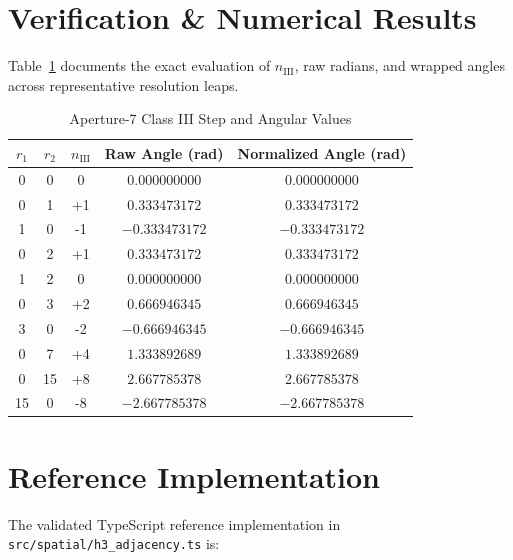 \documentclass[10pt,journal,compsoc]{IEEEtran}
\begin{document}
\section{Verification \& Numerical Results}

Table~\ref{tab:verification} documents the exact evaluation of $n_{\text{III}}$, raw radians, and wrapped angles across representative resolution leaps.

\begin{table}[htbp]
\caption{Aperture-7 Class III Step and Angular Values}
\label{tab:verification}
\centering
\begin{tabular}{ccccc}
\toprule
$r_1$ & $r_2$ & $n_{\text{III}}$ & Raw Angle (rad) & Normalized Angle (rad) \\
\midrule
0 & 0  &  0 & $0.000000000$ & $0.000000000$ \\
0 & 1  & +1 & $0.333473172$ & $0.333473172$ \\
1 & 0  & -1 & $-0.333473172$ & $-0.333473172$ \\
0 & 2  & +1 & $0.333473172$ & $0.333473172$ \\
1 & 2  &  0 & $0.000000000$ & $0.000000000$ \\
0 & 3  & +2 & $0.666946345$ & $0.666946345$ \\
3 & 0  & -2 & $-0.666946345$ & $-0.666946345$ \\
0 & 7  & +4 & $1.333892689$ & $1.333892689$ \\
0 & 15 & +8 & $2.667785378$ & $2.667785378$ \\
15 & 0 & -8 & $-2.667785378$ & $-2.667785378$ \\
\bottomrule
\end{tabular}
\end{table}

\section{Reference Implementation}
The validated TypeScript reference implementation in \texttt{src/spatial/h3\_adjacency.ts} is:
\end{document}
